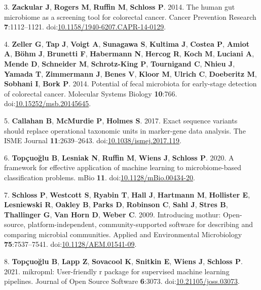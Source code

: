 \documentclass[]{article}
\begin{document}
3. \textbf{{Zackular} J}, \textbf{{Rogers} M}, \textbf{{Ruffin} M},
\textbf{{Schloss} P}. 2014. The human gut microbiome as a screening tool
for colorectal cancer. Cancer Prevention Research \textbf{7}:1112--1121.
doi:\href{http://dx.doi.org/10.1158/1940-6207.CAPR-14-0129}{10.1158/1940-6207.CAPR-14-0129}.

4. \textbf{{Zeller} G}, \textbf{{Tap} J}, \textbf{{Voigt} A},
\textbf{{Sunagawa} S}, \textbf{{Kultima} J}, \textbf{{Costea} P},
\textbf{{Amiot} A}, \textbf{{Böhm} J}, \textbf{{Brunetti} F},
\textbf{{Habermann} N}, \textbf{{Hercog} R}, \textbf{{Koch} M},
\textbf{{Luciani} A}, \textbf{{Mende} D}, \textbf{{Schneider} M},
\textbf{{Schrotz-King} P}, \textbf{{Tournigand} C}, \textbf{{Nhieu} J},
\textbf{{Yamada} T}, \textbf{{Zimmermann} J}, \textbf{{Benes} V},
\textbf{{Kloor} M}, \textbf{{Ulrich} C}, \textbf{{Doeberitz} M},
\textbf{{Sobhani} I}, \textbf{{Bork} P}. 2014. Potential of fecal
microbiota for early-stage detection of colorectal cancer. Molecular
Systems Biology \textbf{10}:766.
doi:\href{http://dx.doi.org/10.15252/msb.20145645}{10.15252/msb.20145645}.

5. \textbf{{Callahan} B}, \textbf{{McMurdie} P}, \textbf{{Holmes} S}.
2017. Exact sequence variants should replace operational taxonomic units
in marker-gene data analysis. The ISME Journal \textbf{11}:2639--2643.
doi:\href{http://dx.doi.org/10.1038/ismej.2017.119}{10.1038/ismej.2017.119}.

6. \textbf{{Topçuo{ğ}lu} B}, \textbf{{Lesniak} N}, \textbf{{Ruffin} M},
\textbf{{Wiens} J}, \textbf{{Schloss} P}. 2020. A framework for
effective application of machine learning to microbiome-based
classification problems. mBio \textbf{11}.
doi:\href{http://dx.doi.org/10.1128/mBio.00434-20}{10.1128/mBio.00434-20}.

7. \textbf{{Schloss} P}, \textbf{{Westcott} S}, \textbf{{Ryabin} T},
\textbf{{Hall} J}, \textbf{{Hartmann} M}, \textbf{{Hollister} E},
\textbf{{Lesniewski} R}, \textbf{{Oakley} B}, \textbf{{Parks} D},
\textbf{{Robinson} C}, \textbf{{Sahl} J}, \textbf{{Stres} B},
\textbf{{Thallinger} G}, \textbf{{Van Horn} D}, \textbf{{Weber} C}.
2009. Introducing mothur: Open-source, platform-independent,
community-supported software for describing and comparing microbial
communities. Applied and Environmental Microbiology
\textbf{75}:7537--7541.
doi:\href{http://dx.doi.org/10.1128/AEM.01541-09}{10.1128/AEM.01541-09}.

8. \textbf{{Topçuo{ğ}lu} B}, \textbf{{Lapp} Z}, \textbf{{Sovacool} K},
\textbf{{Snitkin} E}, \textbf{{Wiens} J}, \textbf{{Schloss} P}. 2021.
mikropml: User-friendly r package for supervised machine learning
pipelines. Journal of Open Source Software \textbf{6}:3073.
doi:\href{http://dx.doi.org/10.21105/joss.03073}{10.21105/joss.03073}.
\end{document}
